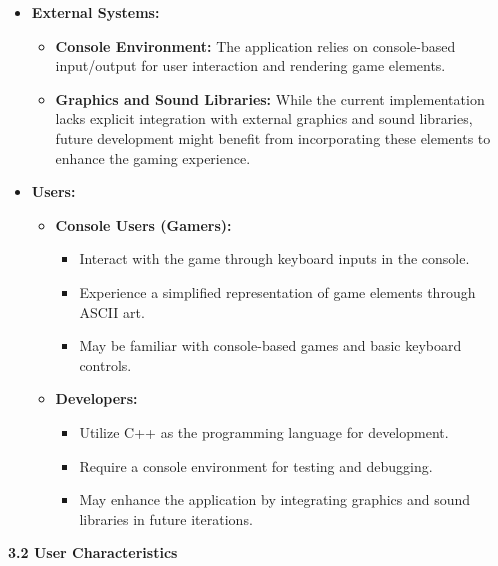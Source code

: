 \documentclass[
]{article}
\begin{document}
\begin{itemize}
\item
  \textbf{External Systems:}

  \begin{itemize}
  \item
    \textbf{Console Environment:} The application relies on
    console-based input/output for user interaction and rendering game
    elements.
  \item
    \textbf{Graphics and Sound Libraries:} While the current
    implementation lacks explicit integration with external graphics and
    sound libraries, future development might benefit from incorporating
    these elements to enhance the gaming experience.
  \end{itemize}
\item
  \textbf{Users:}

  \begin{itemize}
  \item
    \textbf{Console Users (Gamers):}

    \begin{itemize}
    \item
      Interact with the game through keyboard inputs in the console.
    \item
      Experience a simplified representation of game elements through
      ASCII art.
    \item
      May be familiar with console-based games and basic keyboard
      controls.
    \end{itemize}
  \item
    \textbf{Developers:}

    \begin{itemize}
    \item
      Utilize C++ as the programming language for development.
    \item
      Require a console environment for testing and debugging.
    \item
      May enhance the application by integrating graphics and sound
      libraries in future iterations.
    \end{itemize}
  \end{itemize}
\end{itemize}

\protect\hypertarget{qeee}{}{}\textbf{3.2 User Characteristics}
\end{document}
